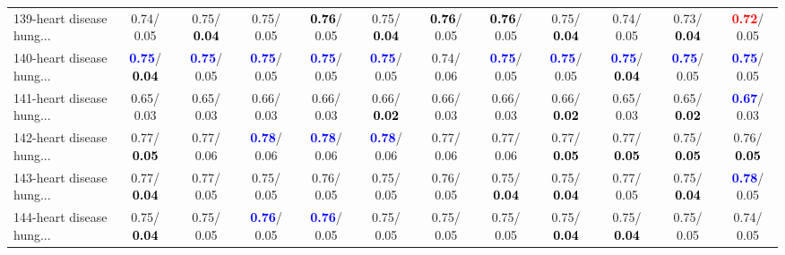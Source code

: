 \begin{table}[h]
\begin{center}
{\begin{tabular}{lc|c|c|c|c|c|c|c|c|c|c}
139-heart disease hung... &   0.74/  0.05 &   0.75/\textcolor{black}{\textbf{  0.04}} &   0.75/  0.05 & \textcolor{black}{\textbf{  0.76}}/  0.05 &   0.75/\textcolor{black}{\textbf{  0.04}} & \textcolor{black}{\textbf{  0.76}}/  0.05 & \textcolor{black}{\textbf{  0.76}}/  0.05 &   0.75/\textcolor{black}{\textbf{  0.04}} &   0.74/  0.05 &   0.73/\textcolor{black}{\textbf{  0.04}} & \textcolor{red}{\textbf{  0.72}}/  0.05 \\
140-heart disease hung... & \textcolor{blue}{\textbf{  0.75}}/\textcolor{black}{\textbf{  0.04}} & \textcolor{blue}{\textbf{  0.75}}/  0.05 & \textcolor{blue}{\textbf{  0.75}}/  0.05 & \textcolor{blue}{\textbf{  0.75}}/  0.05 & \textcolor{blue}{\textbf{  0.75}}/  0.05 &   0.74/  0.06 & \textcolor{blue}{\textbf{  0.75}}/  0.05 & \textcolor{blue}{\textbf{  0.75}}/  0.05 & \textcolor{blue}{\textbf{  0.75}}/\textcolor{black}{\textbf{  0.04}} & \textcolor{blue}{\textbf{  0.75}}/  0.05 & \textcolor{blue}{\textbf{  0.75}}/  0.05 \\
141-heart disease hung... &   0.65/  0.03 &   0.65/  0.03 &   0.66/  0.03 &   0.66/  0.03 &   0.66/\textcolor{black}{\textbf{  0.02}} &   0.66/  0.03 &   0.66/  0.03 &   0.66/\textcolor{black}{\textbf{  0.02}} &   0.65/  0.03 &   0.65/\textcolor{black}{\textbf{  0.02}} & \textcolor{blue}{\textbf{  0.67}}/  0.03 \\
142-heart disease hung... &   0.77/\textcolor{black}{\textbf{  0.05}} &   0.77/  0.06 & \textcolor{blue}{\textbf{  0.78}}/  0.06 & \textcolor{blue}{\textbf{  0.78}}/  0.06 & \textcolor{blue}{\textbf{  0.78}}/  0.06 &   0.77/  0.06 &   0.77/  0.06 &   0.77/\textcolor{black}{\textbf{  0.05}} &   0.77/\textcolor{black}{\textbf{  0.05}} &   0.75/\textcolor{black}{\textbf{  0.05}} &   0.76/\textcolor{black}{\textbf{  0.05}} \\ \hline
143-heart disease hung... &   0.77/\textcolor{black}{\textbf{  0.04}} &   0.77/  0.05 &   0.75/  0.05 &   0.76/  0.05 &   0.75/  0.05 &   0.76/  0.05 &   0.75/\textcolor{black}{\textbf{  0.04}} &   0.75/\textcolor{black}{\textbf{  0.04}} &   0.77/  0.05 &   0.75/\textcolor{black}{\textbf{  0.04}} & \textcolor{blue}{\textbf{  0.78}}/  0.05 \\
144-heart disease hung... &   0.75/\textcolor{black}{\textbf{  0.04}} &   0.75/  0.05 & \textcolor{blue}{\textbf{  0.76}}/  0.05 & \textcolor{blue}{\textbf{  0.76}}/  0.05 &   0.75/  0.05 &   0.75/  0.05 &   0.75/  0.05 &   0.75/\textcolor{black}{\textbf{  0.04}} &   0.75/\textcolor{black}{\textbf{  0.04}} &   0.75/  0.05 &   0.74/  0.05 \\

\end{tabular}}
\end{center}
\end{table}
